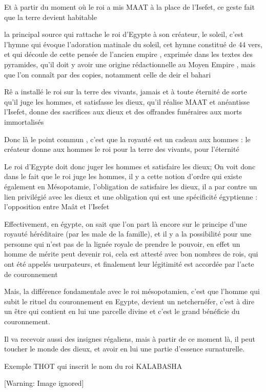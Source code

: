 \documentclass[a4paper,10pt]{article}
\begin{document}
Et  à partir du moment où le roi a mis MAAT à la place de
l'Isefet, ce geste fait que la terre devient habitable

la principal source qui rattache le roi d'Egypte à son
créateur, le soleil, c'est l'hymne
qui évoque l'adoration matinale du soleil, cet hymne
constitué de 44 vers, et qui découle de cette pensée de
l'ancien empire , exprimée dans les textes des
pyramides, qu'il doit y avoir une origine
rédactionnelle au Moyen Empire , mais que l'on connaît
par des copies, notamment celle de deir el bahari

Rê a installé le roi sur la terre des vivants,  jamais et à toute
éternité de sorte qu'il juge les hommes, et satisfasse
les dieux, qu'il réalise MAAT et anéantisse
l'Isefet, donne des sacrifices aux dieux et des
offrandes funéraires aux morts immortalisés

Donc là le point commun , c'est que la royauté est un
cadeau aux hommes : le créateur donne aux hommes le roi pour la terre
des vivants, pour l'éternité

Le roi d'Egypte doit donc juger les hommes et
satisfaire les dieux; On voit donc dans le fait que le roi juge les
hommes, il y a cette notion d'ordre qui existe
également en Mésopotamie, l'obligation de satisfaire
les dieux,  il a par contre un lien privilégié avec les dieux et une
obligation qui est une spécificité égyptienne :
l'opposition entre Maât et l'Isefet

Effectivement, en égypte, on sait que l'on part là
encore sur le principe d'une royauté héréditaire (par
les male de la famille), et il y a la possibilité pour une personne qui
n'est pas de la lignée royale de prendre le pouvoir, 
en effet un homme de mérite peut devenir roi, cela est attesté avec bon
nombres de rois, qui ont été appelés usurpateurs, et finalement leur
légitimité est accordée par l'acte de couronnement

Mais, la différence fondamentale avec le roi mésopotamien,
c'est que l'homme qui subit le rituel
du couronnement en Egypte, devient un netchernéfer,
c'est à dire un  être qui contient en lui une parcelle
divine et c'est le grand bénéficie du couronnement.

Il va recevoir aussi des insignes régaliens, mais à partir de ce moment
là, il peut toucher le monde des dieux, et avoir en lui une partie
d'essence surnaturelle.

Exemple THOT qui inscrit le nom du roi KALABASHA

  [Warning: Image ignored] %
 
\end{document}

